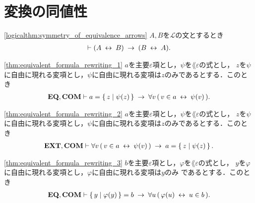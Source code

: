 \section{変換の同値性}
	\begin{screen}
		\begin{logicalthm}[同値記号の対称律]
		\ref{logicalthm:symmetry_of_equivalence_arrows}
			$A,B$を$\mathcal{L}$の文とするとき
			\begin{align}
				\vdash (A \hspace{0.25em}\leftrightarrow\hspace{0.25em} B) \hspace{0.25em}\rightarrow\hspace{0.25em} (B \hspace{0.25em}\leftrightarrow\hspace{0.25em} A).
			\end{align}
		\end{logicalthm}
	\end{screen}
	
	\begin{screen}
		\begin{thm}
		\ref{thm:equivalent_formula_rewriting_1}
			$a$を主要$\varepsilon$項とし，$\psi$を$\lang{\varepsilon}$の式とし，
			$z$を$\psi$に自由に現れる変項とし，$\psi$に自由に現れる変項は$z$のみであるとする．このとき
			\begin{align}
				\mbox{{\bf EQ}},\mbox{\bf COM} \vdash a = \left\{\, z \mid \psi(z)\, \right\} 
				\hspace{0.25em}\rightarrow\hspace{0.25em} \forall v\, (\, v \in a \hspace{0.25em}\leftrightarrow\hspace{0.25em} \psi(v)\, ).
			\end{align}
		\end{thm}
	\end{screen}
	
	\begin{screen}
		\begin{thm}
		\ref{thm:equivalent_formula_rewriting_2}
			$a$を主要$\varepsilon$項とし，$\psi$を$\lang{\varepsilon}$の式とし，
			$z$を$\psi$に自由に現れる変項とし，$\psi$に自由に現れる変項は$z$のみであるとする．このとき
			\begin{align}
				\mbox{{\bf EXT}},\mbox{\bf COM} \vdash \forall v\, (\, v \in a \hspace{0.25em}\leftrightarrow\hspace{0.25em} \psi(v)\, )
				\hspace{0.25em}\rightarrow\hspace{0.25em} a = \left\{\, z \mid \psi(z)\, \right\}.
			\end{align}
		\end{thm}
	\end{screen}
	
	\begin{screen}
		\begin{thm}
		\ref{thm:equivalent_formula_rewriting_3}
			$b$を主要$\varepsilon$項とし，$\varphi$を$\lang{\varepsilon}$の式とし，
			$y$を$\varphi$に自由に現れる変項とし，$\varphi$に自由に現れる変項は$y$のみ
			であるとする．このとき
			\begin{align}
				\mbox{{\bf EQ}},\mbox{\bf COM} \vdash \left\{\, y \mid \varphi(y)\, \right\} = b 
				\hspace{0.25em}\rightarrow\hspace{0.25em} \forall u\, (\, \varphi(u) \hspace{0.25em}\leftrightarrow\hspace{0.25em} u \in b\, ).
			\end{align}
		\end{thm}
	\end{screen}
	
